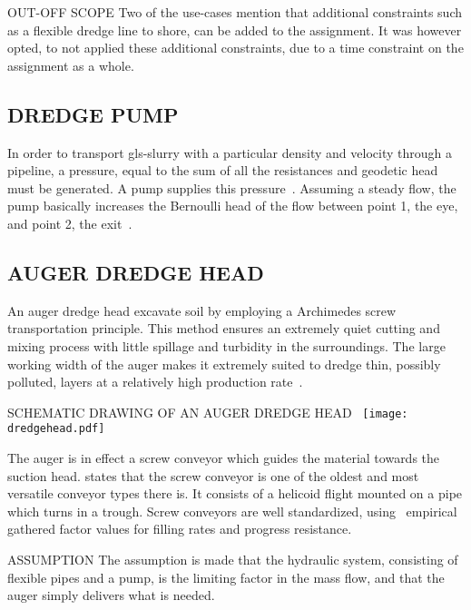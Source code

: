 \begin{RoyalNote}{OUT-OFF SCOPE}
    Two of the use-cases mention that additional constraints such as a flexible dredge line to shore, can be added to
    the
    assignment. It was however opted, to not applied these additional constraints, due to a time constraint on the
    assignment as a whole.
\end{RoyalNote}

\subsection{DREDGE PUMP}
In order to transport \gls{gls-slurry} with a particular density and velocity through a pipeline, a pressure, equal to
the sum of all the resistances and geodetic head must be generated. A pump supplies this
pressure~\cite{van_den_berg_ihc_2013}. Assuming a steady flow, the pump basically increases the Bernoulli head of the
flow between point 1, the eye, and point 2, the exit~\cite{white_fluid_2011}.

\subsection{AUGER DREDGE HEAD}
An auger dredge head excavate soil by employing a Archimedes screw transportation principle. This method ensures an
extremely quiet cutting and mixing process with little spillage and turbidity in the surroundings. The large working
width of the auger makes it extremely suited to dredge thin, possibly polluted, layers at a relatively high production
rate~\cite{van_der_schrieck_dredging_2014}.

\begin{RoyalFigure}[htb, label=fig:dredge_head]{SCHEMATIC DRAWING OF AN AUGER DREDGE 
HEAD~\cite{wetering_ihc_mti_crawler_dredger_final_report_2018} }
    \texttt{[image: dredgehead.pdf]}
\end{RoyalFigure}

The auger is in effect a screw conveyor which guides the material towards the suction head. \citet{perry_2007} states
that the screw conveyor is one of the oldest and most versatile conveyor types there is. It consists of a helicoid
flight mounted on a pipe which turns in a trough. Screw conveyors are well standardized,
using~\citet{international_standard_iso_neniso_1981} empirical gathered factor values for filling rates and progress
resistance.

\begin{RoyalNote}[label=assumption_dredge_speed]{ASSUMPTION}
    The assumption is made that the hydraulic system, consisting of flexible pipes and a pump, is the limiting factor
    in the
    mass flow, and that the auger simply delivers what is needed.
\end{RoyalNote}
